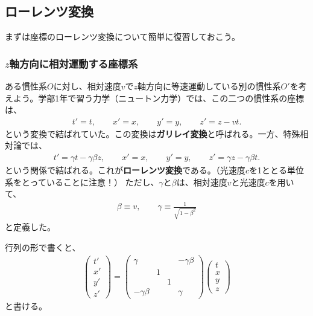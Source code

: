 \documentclass[10pt,a4paper]{jarticle}
\begin{document}
\subsection{ローレンツ変換}
まずは座標のローレンツ変換について簡単に復習しておこう。

\subsubsection{$z$軸方向に相対運動する座標系}
ある慣性系$O$に対し、相対速度$v$で$z$軸方向に等速運動している別の慣性系$O'$を考えよう。学部1年で習う力学（ニュートン力学）では、この二つの慣性系の座標は、
\begin{align}
t' = t, \qquad
x' = x, \qquad
y' = y, \qquad
z' = z - v t.
\end{align}
という変換で結ばれていた。この変換は\textbf{ガリレイ変換}と呼ばれる。一方、特殊相対論では、
\begin{align}
t' = \gamma t - \gamma\beta z, \qquad
x' = x, \qquad
y' = y, \qquad
z' = \gamma z - \gamma\beta t.
\end{align}
という関係で結ばれる。これが\textbf{ローレンツ変換}である。（光速度$c$を1ととる単位系をとっていることに注意！）
ただし、$\gamma$と$\beta$は、相対速度$v$と光速度$c$を用いて、
\begin{align}
\beta \equiv v, \qquad
\gamma \equiv \frac{1}{\sqrt{1-\beta^2}}
\end{align}
と定義した。

行列の形で書くと、
\begin{align}
\left(\begin{array}{c}
t' \\
x' \\
y' \\
z'
\end{array}\right)
%
=
%
\left(\begin{array}{cccc}
\gamma &&& -\gamma\beta\\
& 1 && \\
&& 1 & \\
-\gamma\beta &&& \gamma
\end{array}\right)
%
\left(\begin{array}{c}
t \\
x \\
y \\
z
\end{array}\right) \label{eq:lorentz z boost}
\end{align}
と書ける。
\end{document}
